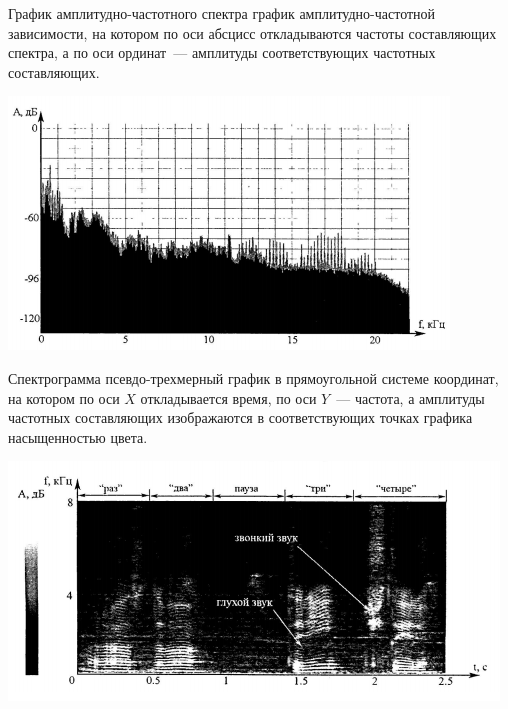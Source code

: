\documentclass{beamer}
\begin{document}
\begin{frame}
\begin{block}{График амплитудно-частотного спектра}
график амплитудно-частотной зависимости, на котором по оси абсцисс откладываются частоты составляющих спектра, а по оси ординат~--- амплитуды соответствующих частотных составляющих. 
\begin{center}
\includegraphics[scale=0.8]{pic-specter-01}
\end{center}
\end{block}
\end{frame} 

\begin{frame}
\begin{block}{Спектрограмма}
псевдо-трехмерный график в прямоугольной системе координат, на котором по оси \(X\) откладывается время, по оси \(Y\)~--- частота, а амплитуды частотных составляющих изображаются в соответствующих точках графика насыщенностью цвета.
\begin{center}
\includegraphics[scale=0.8]{pic-specter-02}
\end{center}
\end{block}
\end{frame} 
\end{document}

